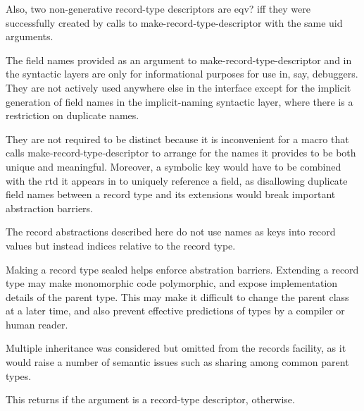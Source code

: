 \begin{entry}{%
}
Also, two non-generative record-type descriptors are eqv? iff they were
successfully created by calls to make-record-type-descriptor with the same
uid arguments.

\begin{rationale}
  The field names provided as an argument to {\cf
    make-record-type-descriptor} and in the syntactic layers are only
  for informational purposes for use in, say, debuggers. They are not
  actively used anywhere else in the interface except for the implicit
  generation of field names in the implicit-naming syntactic layer,
  where there is a restriction on duplicate names.

  They are not required to be distinct because it is inconvenient for
  a macro that calls make-record-type-descriptor to arrange for the
  names it provides to be both unique and meaningful. Moreover, a
  symbolic key would have to be combined with the rtd it appears in to
  uniquely reference a field, as disallowing duplicate field names
  between a record type and its extensions would break important
  abstraction barriers.

  The record abstractions described here do not use names as keys into
  record values but instead indices relative to the record type.
\end{rationale}

\begin{rationale}
  Making a record type sealed helps enforce abstration barriers.
  Extending a record type may make monomorphic code polymorphic, and
  expose implementation details of the parent type.  This may make it
  difficult to change the parent class at a later time, and also
  prevent effective predictions of types by a compiler or human
  reader.
\end{rationale}

\begin{rationale}
  Multiple inheritance was considered but omitted from the records
  facility, as it would raise a number of semantic issues such as
  sharing among common parent types.
\end{rationale}
\end{entry}

\begin{entry}{%
}
   
This returns \schtrue if the argument is a record-type descriptor,
\schfalse{} otherwise.
\end{entry}

